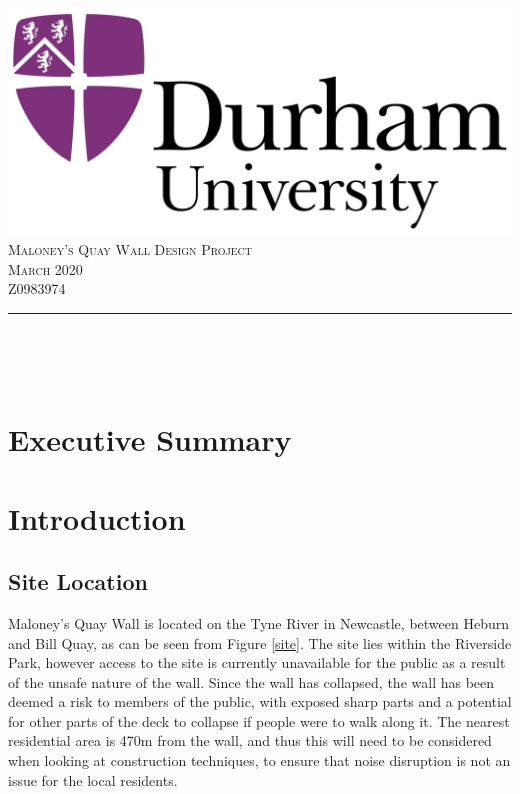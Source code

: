\documentclass[12pt, a4paper]{article}
\begin{document}
\begin{titlepage}
	\centering
    \vspace*{5 cm}
    \includegraphics[scale = 0.75]{durhamLogo.jpg}\\[1.0 cm]	
    \textsc{\LARGE Maloney's Quay Wall Design Project}\\[2.0 cm]
	\textsc{\Large March 2020}\\[0.5 cm]
	\textsc{\Large Z0983974}\\[0.5 cm]
	\rule{\linewidth}{0.2 mm} \\[0.3 cm]
	\begin{minipage}{0.4\textwidth}
			\end{minipage}~
\end{titlepage}

\section{Executive Summary}
\tableofcontents

\section{Introduction}
\subsection{Site Location}
Maloney's Quay Wall is located on the Tyne River in Newcastle, between Heburn and Bill Quay, as can be seen from Figure \ref{site}. The site lies within the Riverside Park, however access to the site is currently unavailable for the public as a result of the unsafe nature of the wall. Since the wall has collapsed, the wall has been deemed a risk to members of the public, with exposed sharp parts and a potential for other parts of the deck to collapse if people were to walk along it. The nearest residential area is 470m from the wall, and thus this will need to be considered when looking at construction techniques, to ensure that noise disruption is not an issue for the local residents.
\end{document}
